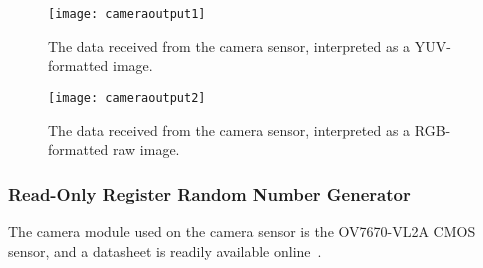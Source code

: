 \begin{figure}
  \centering
  \texttt{[image: cameraoutput1]}
  \caption{The data received from the camera sensor, interpreted as a YUV-formatted image.}
  \label{fig:yuvimage}
\end{figure}

\begin{figure}
  \centering
  \texttt{[image: cameraoutput2]}
  \caption{The data received from the camera sensor, interpreted as a RGB-formatted raw image.}
  \label{fig:rgbimage}
\end{figure}

\subsubsection{Read-Only Register Random Number Generator}
The camera module used on the camera sensor is the OV7670-VL2A CMOS sensor,
and a datasheet is readily available online~\cite{omnivisiondatasheet}.